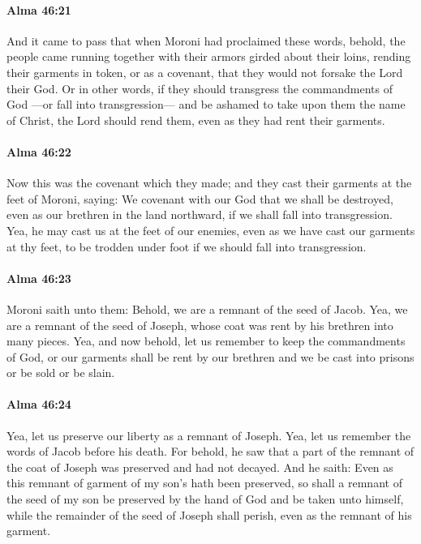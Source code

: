		\paragraph{Alma 46:21} %
			\label{ALMA-46-21}

			And it came to pass that when Moroni had proclaimed these words,
			behold, the people came running together
			with their armors girded about their loins,
			rending their garments in token, or as a covenant,
			that they would not forsake the Lord their God.
			Or in other words, if they should transgress the commandments of God
			---or fall into transgression---
			and be ashamed to take upon them the name of Christ,
			the Lord should rend them, even as they had rent their garments.

		\paragraph{Alma 46:22} %
			\label{ALMA-46-22}

			Now this was the covenant which they made;
			and they cast their garments at the feet of Moroni, saying:
			We covenant with our God that we shall be destroyed,
			even as our brethren in the land northward,
			if we shall fall into transgression.
			Yea, he may cast us at the feet of our enemies,
			even as we have cast our garments at thy feet,
			to be trodden under foot if we should fall into transgression.

		\paragraph{Alma 46:23} %
			\label{ALMA-46-23}

			Moroni saith unto them:
			Behold, we are a remnant of the seed of Jacob.
			Yea, we are a remnant of the seed of Joseph,
			whose coat was rent by his brethren into many pieces.
			Yea, and now behold, let us remember to keep the commandments of God,
			or our garments shall be rent by our brethren
			and we be cast into prisons or be sold or be slain.

		\paragraph{Alma 46:24} %
			\label{ALMA-46-24}

			Yea, let us preserve our liberty as a remnant of Joseph.
			Yea, let us remember the words of Jacob before his death.
			For behold, he saw that a part of the remnant of the coat of Joseph
			was preserved and had not decayed.
			And he saith:
			Even as this remnant of garment of my son's hath been preserved,
			so shall a remnant of the seed of my son
			be preserved by the hand of God and be taken unto himself,
			while the remainder of the seed of Joseph shall perish,
			even as the remnant of his garment.

